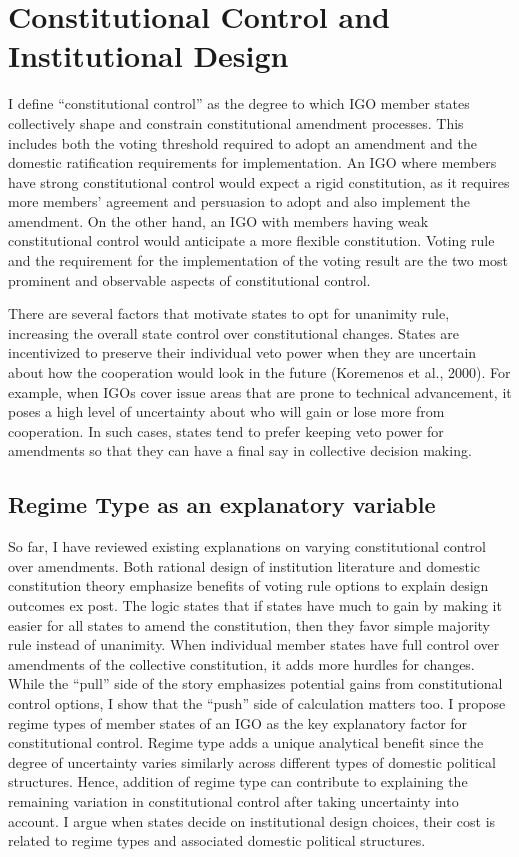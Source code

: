 \documentclass[12pt]{article}
\begin{document}
\section{Constitutional Control and Institutional Design}

I define “constitutional control” as the degree to which IGO member states collectively shape and constrain constitutional amendment processes. This includes both the voting threshold required to adopt an amendment and the domestic ratification requirements for implementation. An IGO where members have strong constitutional control would expect a rigid constitution, as it requires more members’ agreement and persuasion to adopt and also implement the amendment. On the other hand, an IGO with members having weak constitutional control would anticipate a more flexible constitution. Voting rule and the requirement for the implementation of the voting result are the two most prominent and observable aspects of constitutional control. 

There are several factors that motivate states to opt for unanimity rule, increasing the overall state control over constitutional changes. States are incentivized to preserve their individual veto power when they are uncertain about how the cooperation would look in the future (Koremenos et al., 2000). For example, when IGOs cover issue areas that are prone to technical advancement, it poses a high level of uncertainty about who will gain or lose more from cooperation. In such cases, states tend to prefer keeping veto power for amendments so that they can have a final say in collective decision making. 

\subsection{Regime Type as an explanatory variable}

So far, I have reviewed existing explanations on varying constitutional control over amendments. Both rational design of institution literature and domestic constitution theory emphasize benefits of voting rule options to explain design outcomes ex post. The logic states that if states have much to gain by making it easier for all states to amend the constitution, then they favor simple majority rule instead of unanimity. When individual member states have full control over amendments of the collective constitution, it adds more hurdles for changes. While the “pull” side of the story emphasizes potential gains from constitutional control options, I show that the “push” side of calculation matters too.
I propose regime types of member states of an IGO as the key explanatory factor for constitutional control. Regime type adds a unique analytical benefit since the degree of uncertainty varies similarly across different types of domestic political structures. Hence, addition of regime type can contribute to explaining the remaining variation in constitutional control after taking uncertainty into account. I argue when states decide on institutional design choices, their cost is related to regime types and associated domestic political structures. 
\end{document}
